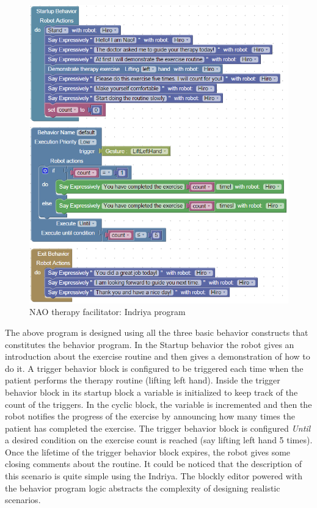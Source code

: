 \begin{figure}
\centering
\includegraphics[width=\textwidth]{../thesis/assets/scenario2_new.png}
\caption[NAO therapy facilitator: Indriya program]{NAO therapy facilitator: Indriya program}
\label{fig:scenario2_program}
\end{figure}
The above program is designed using all the three basic behavior constructs that constitutes the behavior program. In the Startup behavior the robot gives an introduction about the exercise routine and then gives a demonstration of how to do it. A trigger behavior block is configured to be triggered each time when the patient performs the therapy routine (lifting left hand). Inside the trigger behavior block in its startup block a variable is initialized to keep track of the count of the triggers. In the cyclic block, the variable is incremented and then the robot notifies the progress of the exercise by announcing how many times the patient has completed the exercise. The trigger behavior block is configured \emph{Until} a desired condition on the exercise count is reached (say lifting left hand 5 times). Once the lifetime of the trigger behavior block expires, the robot gives some closing comments about the routine. It could be noticed that the description of this scenario is quite simple using the Indriya. The blockly editor powered with the behavior program logic abstracts the complexity of designing realistic scenarios.

